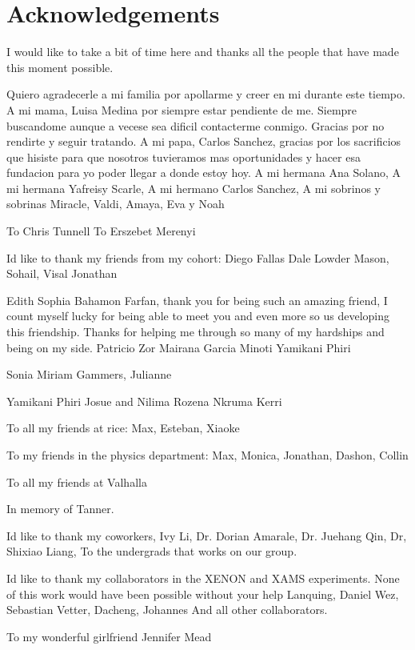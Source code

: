 \section*{Acknowledgements}

I would like to take a bit of time here and thanks all the people that have made this moment possible.

Quiero agradecerle a mi familia por apollarme y creer en mi durante este tiempo. A mi mama, Luisa Medina por siempre estar pendiente de me. Siempre buscandome aunque a vecese sea dificil contacterme conmigo. Gracias por no rendirte y seguir tratando. A mi papa, Carlos Sanchez, gracias por los sacrificios que hisiste para que nosotros tuvieramos mas oportunidades y hacer esa fundacion para yo poder llegar a donde estoy hoy.
A mi hermana Ana Solano, 
A mi hermana Yafreisy Scarle,
A mi hermano Carlos Sanchez,
A mi sobrinos y sobrinas Miracle, Valdi, Amaya, Eva y Noah

To Chris Tunnell
To Erszebet Merenyi

Id like to thank my friends from my cohort: 
Diego Fallas
Dale Lowder
Mason, Sohail, Visal Jonathan

Edith Sophia Bahamon Farfan, thank you for being such an amazing friend, I count myself lucky for being able to meet you and even more so us developing this friendship. Thanks for helping me through so many of my hardships and being on my side.
Patricio Zor
Mairana Garcia
Minoti
Yamikani Phiri

Sonia
Miriam Gammers,
Julianne

Yamikani Phiri
Josue and Nilima
Rozena
Nkruma
Kerri

To all my friends at rice: Max, Esteban, Xiaoke

To my friends in the physics department: Max, Monica, Jonathan, Dashon, Collin

To all my friends at Valhalla



In memory of Tanner.


Id like to thank my coworkers,
Ivy Li,
Dr. Dorian Amarale,
Dr. Juehang Qin,
Dr, Shixiao Liang,
To the undergrads that works on our group.

Id like to thank my collaborators in the XENON and XAMS experiments. None of this work would have been possible without your help
Lanquing,
Daniel Wez,
Sebastian Vetter,
Dacheng,
Johannes
And all other collaborators.

To my wonderful girlfriend Jennifer Mead



